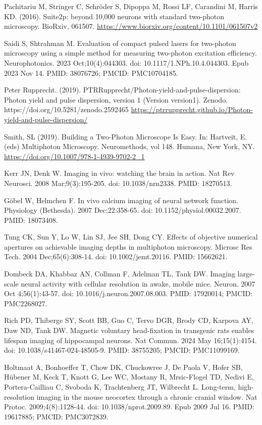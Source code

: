 \documentclass[10pt,letterpaper]{article}
\begin{document}
\begin{thebibliography}{10}
Pachitariu M, Stringer C, Schröder S, Dipoppa M, Rossi LF, Carandini M, Harris KD. (2016). Suite2p: beyond 10,000 neurons with standard two-photon microscopy. BioRxiv, 061507. \url{https://www.biorxiv.org/content/10.1101/061507v2}

Saidi S, Shtrahman M. Evaluation of compact pulsed lasers for two-photon microscopy using a simple method for measuring two-photon excitation efficiency. Neurophotonics. 2023 Oct;10(4):044303. doi: 10.1117/1.NPh.10.4.044303. Epub 2023 Nov 14. PMID: 38076726; PMCID: PMC10704185.

Peter Rupprecht. (2019). PTRRupprecht/Photon-yield-and-pulse-dispersion: Photon yield and pulse dispersion, version 1 (Version version1). Zenodo. https://doi.org/10.5281/zenodo.2592465 \url{https://ptrrupprecht.github.io/Photon-yield-and-pulse-dispersion/}

Smith, SL (2019). Building a Two-Photon Microscope Is Easy. In: Hartveit, E. (eds) Multiphoton Microscopy. Neuromethods, vol 148. Humana, New York, NY. \url{https://doi.org/10.1007/978-1-4939-9702-2_1}

Kerr JN, Denk W. Imaging in vivo: watching the brain in action. Nat Rev Neurosci. 2008 Mar;9(3):195-205. doi: 10.1038/nrn2338. PMID: 18270513.

G\"obel W, Helmchen F. In vivo calcium imaging of neural network function. Physiology (Bethesda). 2007 Dec;22:358-65. doi: 10.1152/physiol.00032.2007. PMID: 18073408.

Tung CK, Sun Y, Lo W, Lin SJ, Jee SH, Dong CY. Effects of objective numerical apertures on achievable imaging depths in multiphoton microscopy. Microsc Res Tech. 2004 Dec;65(6):308-14. doi: 10.1002/jemt.20116. PMID: 15662621.

Dombeck DA, Khabbaz AN, Collman F, Adelman TL, Tank DW. Imaging large-scale neural activity with cellular resolution in awake, mobile mice. Neuron. 2007 Oct 4;56(1):43-57. doi: 10.1016/j.neuron.2007.08.003. PMID: 17920014; PMCID: PMC2268027.

Rich PD, Thiberge SY, Scott BB, Guo C, Tervo DGR, Brody CD, Karpova AY, Daw ND, Tank DW. Magnetic voluntary head-fixation in transgenic rats enables lifespan imaging of hippocampal neurons. Nat Commun. 2024 May 16;15(1):4154. doi: 10.1038/s41467-024-48505-9. PMID: 38755205; PMCID: PMC11099169.

Holtmaat A, Bonhoeffer T, Chow DK, Chuckowree J, De Paola V, Hofer SB, Hübener M, Keck T, Knott G, Lee WC, Mostany R, Mrsic-Flogel TD, Nedivi E, Portera-Cailliau C, Svoboda K, Trachtenberg JT, Wilbrecht L. Long-term, high-resolution imaging in the mouse neocortex through a chronic cranial window. Nat Protoc. 2009;4(8):1128-44. doi: 10.1038/nprot.2009.89. Epub 2009 Jul 16. PMID: 19617885; PMCID: PMC3072839.


\end{thebibliography}
\end{document}
